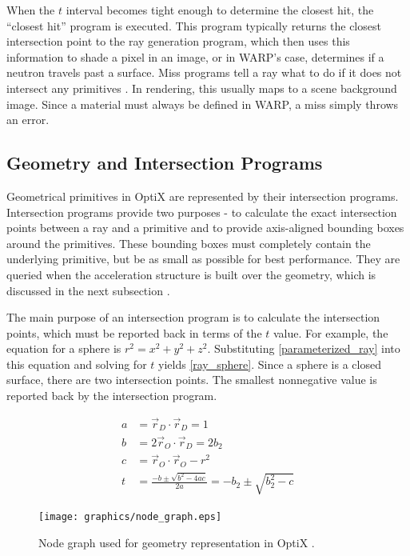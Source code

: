 When the $t$ interval becomes tight enough to determine the closest hit, the ``closest hit'' program is executed.  This program typically returns the closest intersection point to the ray generation program, which then uses this information to shade a pixel in an image, or in WARP's case, determines if a neutron travels past a surface.  Miss programs tell a ray what to do if it does not intersect any primitives \cite{optix}.  In rendering, this usually maps to a scene background image.  Since a material must always be defined in WARP, a miss simply throws an error.

\subsection{Geometry and Intersection Programs}

Geometrical primitives in OptiX are represented by their intersection programs.  Intersection programs provide two purposes - to calculate the exact intersection points between a ray and a primitive and to provide axis-aligned bounding boxes around the primitives.  These bounding boxes must completely contain the underlying primitive, but be as small as possible for best performance.  They are queried when the acceleration structure is built over the geometry, which is discussed in the next subsection \cite{optix}.  

The main purpose of an intersection program is to calculate the intersection points, which must be reported back in terms of the $t$ value.  For example, the equation for a sphere is $r^2=x^2+y^2+z^2$.  Substituting \eqref{parameterized_ray} into this equation and solving for $t$ yields \eqref{ray_sphere}.  Since a sphere is a closed surface, there are two intersection points.  The smallest nonnegative value is reported back by the intersection program.

\begin{equation}
\label{ray_sphere}
\begin{split}
a &= \vec{r}_D \cdot \vec{r}_D = 1\\
b &= 2 \vec{r}_O \cdot \vec{r}_D = 2b_2\\
c &= \vec{r}_O \cdot \vec{r}_O - r^2 \\
t &= \frac{-b \pm \sqrt{b^2-4ac}}{2a} = -b_2 \pm \sqrt{b_2^2-c}
\end{split}
\end{equation}

 \begin{figure}[h!] 
  \centering
    \texttt{[image: graphics/node\_graph.eps]}
     \caption{Node graph used for geometry representation in OptiX \cite{optix}. \label{node_graph}}
\end{figure}


